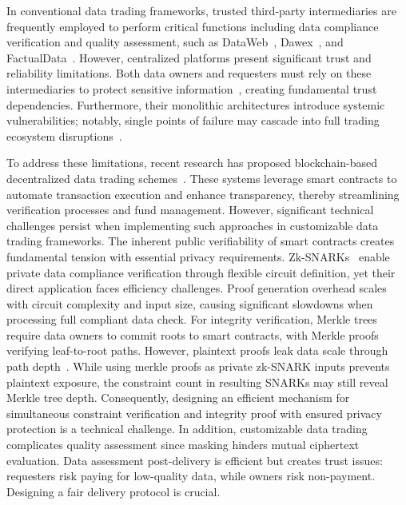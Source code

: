\documentclass[journal]{IEEEtran}
\begin{document}
In conventional data trading frameworks, trusted third-party intermediaries are frequently employed to perform critical functions including data compliance verification and quality assessment, such as DataWeb~\cite{dataweb}, Dawex~\cite{dawex}, and FactualData~\cite{factualdata}. However, centralized platforms present significant trust and reliability limitations. Both data owners and requesters must rely on these intermediaries to protect sensitive information~\cite{d2009user}, creating fundamental trust dependencies. Furthermore, their monolithic architectures introduce systemic vulnerabilities; notably, single points of failure may cascade into full trading ecosystem disruptions~\cite{dooley2001designing}.

To address these limitations, recent research has proposed blockchain-based decentralized data trading schemes~\cite{buterin2014next, an2021secure,chen2024two}. These systems leverage smart contracts to automate transaction execution and enhance transparency, thereby streamlining verification processes and fund management.  However, significant technical challenges persist when implementing such approaches in customizable data trading frameworks. The inherent public verifiability of smart contracts creates fundamental tension with essential privacy requirements.  Zk-SNARKs~\cite{ben2014succinct,groth2016size,gabizon2019Plonk} enable private data compliance verification through flexible circuit definition, yet their direct application faces efficiency challenges. Proof generation overhead scales with circuit complexity and input size, causing significant slowdowns when processing full compliant data check. For integrity verification, Merkle trees~\cite{islam2025multiple,song2023blockchain,aitzhan2016security} require data owners to commit roots to smart contracts, with Merkle proofs verifying leaf-to-root paths. However, plaintext proofs leak data scale through path depth~\cite{sun2020adaptive}. While using merkle proofs as private zk-SNARK inputs prevents plaintext exposure, the constraint count in resulting SNARKs may still reveal Merkle tree depth. Consequently, designing an efficient mechanism for simultaneous constraint verification and integrity proof with ensured privacy protection is a technical challenge. In addition, customizable data trading complicates quality assessment since masking hinders mutual ciphertext evaluation. Data assessment post-delivery is efficient but creates trust issues: requesters risk paying for low-quality data, while owners risk non-payment.  Designing a fair delivery protocol is crucial. 
\end{document}
